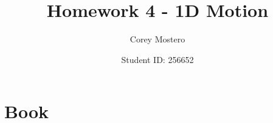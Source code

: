 \documentclass{article}
\title{Homework 4 - 1D Motion}
\author{Corey Mostero}
\date{Student ID: 256652}
\begin{document}
\newcommand{\hr}{\par\noindent\rule{\textwidth}{0.4pt}}

\newcommand{\bc}[1]{
	\begin{equation*}
		\begin{boxed}
			{#1}
		\end{boxed}
	\end{equation*}
}

\newcommand{\cond}[2]{
	\ifmmode
		{#1} \quad {#2}
	\else
		$$ {#1} \quad {#2} $$
	\fi
}

\maketitle
\newpage

\tableofcontents

\section{Book}
\end{document}

